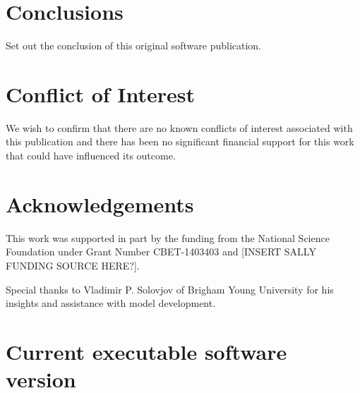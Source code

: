 \documentclass[preprint,12pt, a4paper]{elsarticle}
\begin{document}
\section{Conclusions}
\label{}

Set out the conclusion of this original software publication.

\section{Conflict of Interest}
%

We wish to confirm that there are no known conflicts of interest associated with this publication and there has been no significant financial support for this work that could have influenced its outcome.


\section*{Acknowledgements}
\label{}

This work was supported in part by the funding from the National Science Foundation under Grant Number CBET-1403403 and [INSERT SALLY FUNDING SOURCE HERE?].

Special thanks to Vladimir P. Solovjov of Brigham Young University for his insights and assistance with model development.





 
 

\section*{Current executable software version}
\label{}
\end{document}
